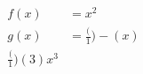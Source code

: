\documentclass{article}
\begin{document}
	\begin{align}
		f(x) &=x^2\\
		g(x) &=\frac(1)-(x)\\
		\frac(1)(3)x^3
	\end{align}
\end{document}

